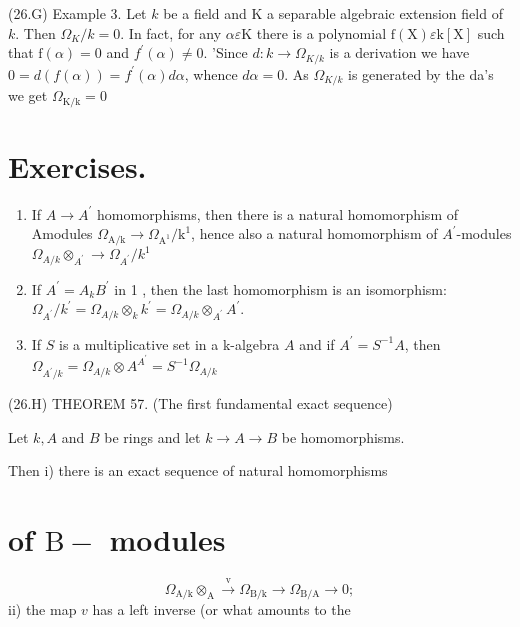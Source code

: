 (26.G) Example 3. Let $k$ be a field and $\mathrm{K}$ a separable algebraic extension field of $k$. Then $\Omega_{K} / k=0$. In fact, for any $\alpha \varepsilon \mathrm{K}$ there is a polynomial $\mathrm{f}(\mathrm{X}) \varepsilon \mathrm{k}[\mathrm{X}]$ such that $\mathrm{f}(\alpha)=0$ and $f^{\prime}(\alpha) \neq 0$. 'Since $d: k \rightarrow \Omega_{K / k}$ is a derivation we have $0=d(f(\alpha))=f^{\prime}(\alpha) d \alpha$, whence $d \alpha=0$. As $\Omega_{K / k}$ is generated by the da's we get $\Omega_{\mathrm{K} / \mathrm{k}}=0$

\section{Exercises.}
\begin{enumerate}
  \item If $A \longrightarrow A^{\prime}$ homomorphisms, then there is a natural homomorphism of Amodules $\Omega_{\mathrm{A} / \mathrm{k}} \rightarrow \Omega_{\mathrm{A}^{1}} / \mathrm{k}^{1}$, hence also a natural homomorphism of $A^{\prime}$-modules $\Omega_{A / k} \otimes_{A^{\prime}} \rightarrow \Omega_{A^{\prime}} / k^{1}$

  \item If $A^{\prime}=A_{k} B^{\prime}$ in 1 , then the last homomorphism is an isomorphism: $\Omega_{A^{\prime}} / k^{\prime}=\Omega_{A / k} \otimes_{k} k^{\prime}=\Omega_{A / k} \otimes_{A^{\prime}} A^{\prime}$.

  \item If $S$ is a multiplicative set in a k-algebra $A$ and if $A^{\prime}=S^{-1} A$, then $\Omega_{A^{\prime} / k}=\Omega_{A / k} \otimes A^{A^{\prime}}=S^{-1} \Omega_{A / k}$

\end{enumerate}
(26.H) THEOREM 57. (The first fundamental exact sequence)

Let $k, A$ and $B$ be rings and let $k \rightarrow A \rightarrow B$ be homomorphisms.

Then i) there is an exact sequence of natural homomorphisms

\section{of $\mathrm{B}-$ modules}
$$
\Omega_{\mathrm{A} / \mathrm{k}} \otimes_{\mathrm{A}} \stackrel{\mathrm{v}}{\rightarrow} \Omega_{\mathrm{B} / \mathrm{k}} \rightarrow \Omega_{\mathrm{B} / \mathrm{A}} \rightarrow 0 ;
$$
ii) the map $v$ has a left inverse (or what amounts to the


